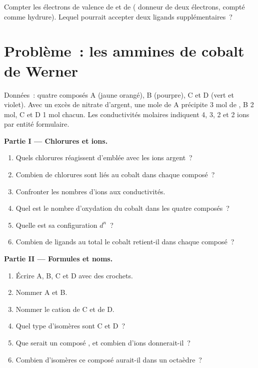 \begin{exercise}[$\star\star\star$]\label{exo:b2:coordination-complexes:12}
Compter les électrons de valence de  et de 
( donneur de deux électrons,  compté comme hydrure). Lequel pourrait accepter deux ligands
supplémentaires~?
\end{exercise}

\section{Problème~: les ammines de cobalt de Werner}

\begin{problem}
\label{pb:b2:coordination-complexes:1}
Données~: quatre composés A  (jaune orangé), B 
(pourpre), C et D  (vert et violet). Avec un excès de nitrate d'argent,
une mole de A précipite 3 mol de , B 2 mol, C et D 1 mol chacun. Les conductivités
molaires indiquent 4, 3, 2 et 2 ions par entité formulaire.

\medskip
\noindent\textbf{Partie I --- Chlorures et ions.}
\begin{enumerate}
  \item Quels chlorures réagissent d'emblée avec les ions argent~?
  \item Combien de chlorures sont liés au cobalt dans chaque composé~?
  \item Confronter les nombres d'ions aux conductivités.
  \item Quel est le nombre d'oxydation du cobalt dans les quatre composés~?
  \item Quelle est sa configuration $d^n$~?
  \item Combien de ligands au total le cobalt retient-il dans chaque composé~?
\end{enumerate}

\medskip
\noindent\textbf{Partie II --- Formules et noms.}
\begin{enumerate}[resume]
  \item Écrire A, B, C et D avec des crochets.
  \item Nommer A et B.
  \item Nommer le cation de C et de D.
  \item Quel type d'isomères sont C et D~?
  \item Que serait un composé , et combien d'ions donnerait-il~?
  \item Combien d'isomères ce composé aurait-il dans un octaèdre~?
\end{enumerate}


\end{problem}
